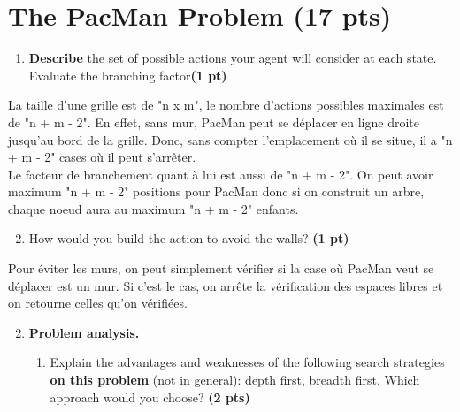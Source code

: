 \documentclass[11pt,a4paper]{../template/report}
\begin{document}
\section{The 
PacMan Problem (17 pts)}

\begin{enumerate}
\setcounter{enumi}{1}
\begin{enumerate}
\item \textbf{Describe} the set of possible actions your agent will consider at each state. Evaluate the branching factor\textbf{(1 pt)}
\end{enumerate}
  
\end{enumerate}

\begin{answer}
La taille d'une grille est de "n x m", le nombre d'actions possibles maximales est de "n + m - 2". En effet, sans mur, PacMan peut se déplacer en ligne droite jusqu'au bord de la grille. Donc, sans compter l'emplacement où il se situe, il a "n + m - 2" cases où il peut s'arrêter. \\
Le facteur de branchement quant à lui est aussi de "n + m - 2". On peut avoir maximum "n + m - 2" positions pour PacMan donc si on construit un arbre, chaque noeud aura au maximum "n + m - 2" enfants.
\end{answer}
\begin{enumerate}
\setcounter{enumi}{1}
\begin{enumerate}
\setcounter{enumii}{1}
    \item  How would you build the action to avoid the walls? \textbf{(1 pt)}
\end{enumerate}
  
\end{enumerate}

\begin{answer}
Pour éviter les murs, on peut simplement vérifier si la case où PacMan veut se déplacer est un mur. Si c'est le cas, on arrête la vérification des espaces libres et on retourne celles qu'on vérifiées.
\end{answer}



\begin{enumerate}
\setcounter{enumi}{1}
    \item \textbf{Problem analysis.}
    \begin{enumerate}
        \item Explain the advantages and weaknesses of the following search strategies \textbf{on this problem} (not in general): depth first, breadth first. Which approach would you choose? \textbf{(2 pts)}
    \end{enumerate}
\end{enumerate}
\end{document}
